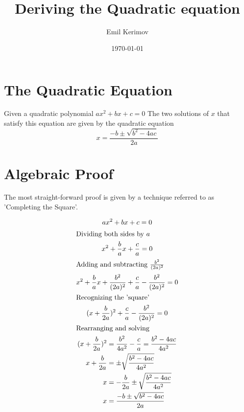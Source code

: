 \documentclass[a4paper]{article}
\title{Deriving the Quadratic equation}
\author{Emil Kerimov}
\date{\today}
\begin{document}
\maketitle

\section{The Quadratic Equation}

Given a quadratic polynomial $ax^2 + bx + c = 0$
The two solutions of $x$ that satisfy this equation are given by the quadratic equation
\begin{equation}
x = \frac{-b \pm \sqrt{b^2 - 4ac}}{2a}
\end{equation}

\section{Algebraic Proof}
The most straight-forward proof is given by a technique referred to as 'Completing the Square'.

\begin{gather*}
ax^2 + bx + c = 0\\
\shortintertext{Dividing both sides by $a$}
x^2 + \frac{b}{a}x + \frac{c}{a} = 0\\
\shortintertext{Adding and subtracting $\frac{b^2}{(2a)^2}$}
x^2 + \frac{b}{a}x + \frac{b^2}{(2a)^2} +  \frac{c}{a} - \frac{b^2}{(2a)^2} = 0\\
\shortintertext{Recognizing the 'square'}
(x+ \frac{b}{2a})^2 +  \frac{c}{a} - \frac{b^2}{(2a)^2} = 0\\
\shortintertext{Rearranging and solving}
\begin{alignedat}{2}
(x + \frac{b}{2a})^2 &= \frac{b^2}{4a^2}-  \frac{c}{a}  = \frac{b^2-4ac}{4a^2}\\
x + \frac{b}{2a} &=\pm \sqrt{ \frac{b^2 - 4ac}{4a^2}}\\
x  &= - \frac{b}{2a} \pm \sqrt{ \frac{b^2 - 4ac}{4a^2}}\\
x  &= \frac{-b \pm \sqrt{b^2 - 4ac}}{2a}\\
\end{alignedat}
\end{gather*}
\end{document}
